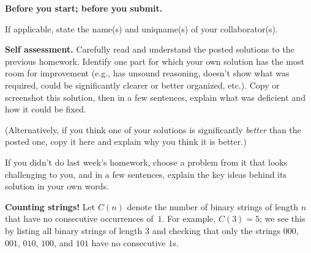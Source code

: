 \documentclass[11pt,addpoints]{exam}
\begin{document}

\hwpreface

\begin{questions}

  \addtocounter{question}{-1}
  \question \textbf{Before you start; before you submit.}

      

    If applicable, state the name(s) and uniqname(s) of your collaborator(s).

    \begin{solution}
       
    \end{solution}


\question[10] \textbf{Self assessment.} \nopagebreak
  Carefully read and understand the posted solutions to the previous homework.
  Identify one part for which your own solution has the most room for improvement (e.g., has unsound reasoning, doesn’t show what was required, could be significantly clearer or better organized, etc.).
  Copy or screenshot this solution, then in a few sentences, explain what was deficient and how it could be fixed.

  (Alternatively, if you think one of your solutions is significantly \emph{better} than the posted one, copy it here and explain why you think it is better.)

  If you didn't do last week's homework, choose a problem from it that looks challenging to you, and in a few sentences, explain the key ideas behind its solution in your own words.

  \begin{solution}

  
        
  \end{solution}

 \question \textbf{Counting strings!}  Let $C(n)$ denote the number of binary strings of length $n$ that have no consecutive occurrences of~$1$.
    For example, $C(3) = 5$; we see this by listing all binary strings of length 3 and checking that only the strings $000$, $001$, $010$, $100$, and $101$ have no consecutive $1$s.
\end{questions}
\end{document}
